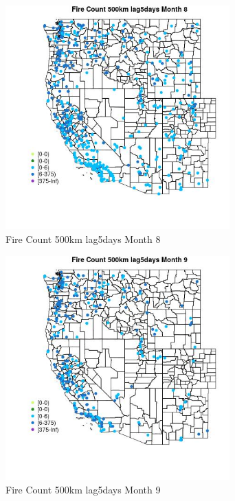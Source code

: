 \begin{figure} 
\centering  
\includegraphics[width=0.77\textwidth]{Code_Outputs/Report_ML_input_PM25_Step4_part_e_de_duplicated_aves_compiled_2019-05-18wNAs_MapObsMo8Fire_Count_500km_lag5days.jpg} 
\caption{\label{fig:Report_ML_input_PM25_Step4_part_e_de_duplicated_aves_compiled_2019-05-18wNAsMapObsMo8Fire_Count_500km_lag5days}Fire Count 500km lag5days Month 8} 
\end{figure} 
 

\clearpage 

\begin{figure} 
\centering  
\includegraphics[width=0.77\textwidth]{Code_Outputs/Report_ML_input_PM25_Step4_part_e_de_duplicated_aves_compiled_2019-05-18wNAs_MapObsMo9Fire_Count_500km_lag5days.jpg} 
\caption{\label{fig:Report_ML_input_PM25_Step4_part_e_de_duplicated_aves_compiled_2019-05-18wNAsMapObsMo9Fire_Count_500km_lag5days}Fire Count 500km lag5days Month 9} 
\end{figure} 
 

